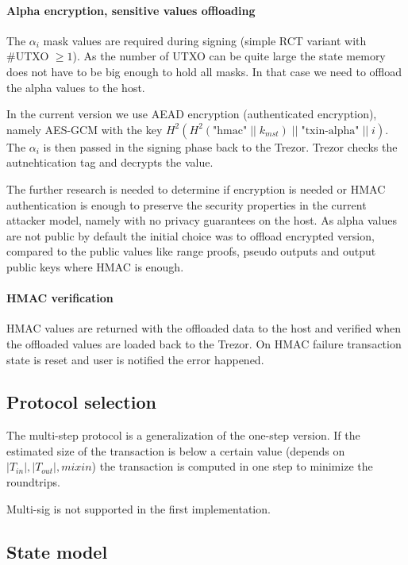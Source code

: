 \documentclass[]{article}
\begin{document}
\paragraph{Alpha encryption, sensitive values offloading}
The $\alpha_i$ mask values are required during signing (simple RCT variant with \#UTXO $\ge 1$). As the number of UTXO can be quite large the state memory does not have to be big enough to hold all masks. In that case we need to offload the alpha values to the host. 

In the current version we use AEAD encryption (authenticated encryption), namely AES-GCM with the key $H^2\left(H^2\left(\text{"hmac"} \; || \; k_{mst}\right) \; || \; \text{"txin-alpha"} \; || \; i\right)$. The $\alpha_i$ is then passed in the signing phase back to the Trezor. Trezor checks the autnehtication tag and decrypts the value. 

The further research is needed to determine if encryption is needed or HMAC authentication is enough to preserve the security properties in the current attacker model, namely with no privacy guarantees on the host. As alpha values are not public by default the initial choice was to offload encrypted version, compared to the public values like range proofs, pseudo outputs and output public keys where HMAC is enough.

\paragraph{HMAC verification}
HMAC values are returned with the offloaded data to the host and verified when the offloaded values are loaded back to the Trezor. 
On HMAC failure transaction state is reset and user is notified the error happened.

\subsection{Protocol selection}
The multi-step protocol is a generalization of the one-step version.
If the estimated size of the transaction is below a certain value (depends on $|T_{in}|, |T_{out}|, mixin$) the transaction is computed in one step to minimize the roundtrips. 

Multi-sig is not supported in the first implementation.

\subsection{State model}
\end{document}
